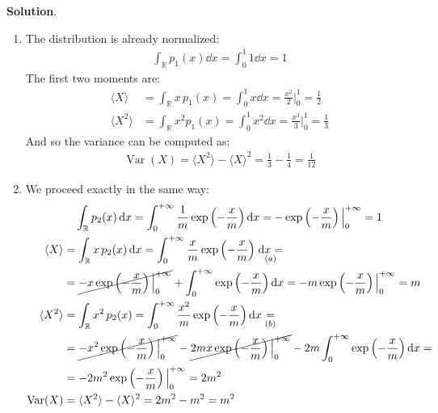 \documentclass[../../main.tex]{subfiles}
\begin{document}
\begin{exo}
    \textbf{Solution}. 
    \begin{enumerate}
        \item The distribution is already normalized:
        \begin{align*}
            \int_\mathbb{R} p_1(x) \dd{x} = \int_0^1 1 \dd{x} = 1
        \end{align*}
        The first two moments are:
        \begin{align*}
            \langle X \rangle &= \int_{\mathbb{R}} x\, p_1(x) = \int_0^1 x \dd{x} = \frac{x^2}{2} \Big|_0^1 = \frac{1}{2}  \\
            \langle X^2 \rangle &= \int_{\mathbb{R}} x^2 p_1(x) = \int_0^1 x^2 \dd{x} = \frac{x^3}{3} \Big|_0^1 = \frac{1}{3} 
        \end{align*}
        And so the variance can be computed as:
        \begin{align*}
            \operatorname{Var}(X) = \langle X^2 \rangle - \langle X \rangle^2 = \frac{1}{3} - \frac{1}{4} = \frac{1}{12}   
        \end{align*}
        \item We proceed exactly in the same way:
        \begin{align*}
            \int_{\mathbb{R}} p_2(x) \dd{x} = \int_0^{+\infty} \frac{1}{m}\exp\left(-\frac{x}{m} \right) \dd{x}= - \exp\left(-\frac{x}{m} \right) \Big|_0^{+\infty} = 1 \span\\
            \langle X \rangle &= \int_\mathbb{R} x\,p_2(x) \dd{x}= \int_0^{+\infty} \frac{x}{m} \exp\left(-\frac{x}{m} \right) \underset{(a)}{\dd{x}=} \\
            &=\cancel{ -x \exp\left(-\frac{x}{m} \right) \Big|_0^{+\infty} }+ \int_0^{+\infty} \exp\left(-\frac{x}{m} \right) \dd{x}= -m \exp\left(-\frac{x}{m} \right)\Big|_0^{+\infty} = m\\
            \langle X^2 \rangle &= \int_{\mathbb{R}} x^2\,p_2(x) = \int_0^{+\infty} \frac{x^2}{m} \exp\left(-\frac{x}{m} \right)  \dd{x} \underset{(b)}{=} \\
            &= \cancel{-x^2 \exp\left(-\frac{x}{m} \right) \Big|_0^{+\infty}} -\cancel{2m x \exp\left(-\frac{x}{m} \right)\Big|_0^{+\infty} }-2m \int_0^{+\infty} \exp\left(-\frac{x}{m} \right)\dd{x} =\\
            &=-2m^2 \exp\left(-\frac{x}{m} \right)\Big|_0^{+\infty} = 2m^2\\
            \operatorname{Var}(X) &= \langle X^2 \rangle - \langle X \rangle^2 = 2m^2 - m^2 = m^2
        \end{align*}

\end{enumerate}
\end{exo}
\end{document}
